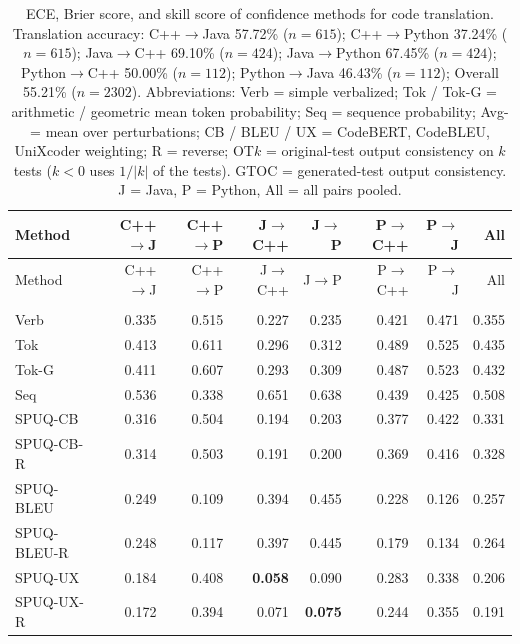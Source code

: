 {\scriptsize
\setlength{\tabcolsep}{2.5pt}
\renewcommand{\arraystretch}{0.95}
\begin{longtable}{@{}lrrrrrrr@{}}
\caption{ECE, Brier score, and skill score of confidence methods for code translation. Translation accuracy: C++$\rightarrow$Java 57.72\% ($n=615$); C++$\rightarrow$Python 37.24\% ($n=615$); Java$\rightarrow$C++ 69.10\% ($n=424$); Java$\rightarrow$Python 67.45\% ($n=424$); Python$\rightarrow$C++ 50.00\% ($n=112$); Python$\rightarrow$Java 46.43\% ($n=112$); Overall 55.21\% ($n=2302$). Abbreviations: Verb = simple verbalized; Tok / Tok-G = arithmetic / geometric mean token probability; Seq = sequence probability; Avg- = mean over perturbations; CB / BLEU / UX = CodeBERT, CodeBLEU, UniXcoder weighting; R = reverse; OT$k$ = original-test output consistency on $k$ tests ($k<0$ uses $1/|k|$ of the tests). GTOC = generated-test output consistency. J = Java, P = Python, All = all pairs pooled.\label{tab:translation-calibration}}\\
\toprule
Method & C++$\to$J & C++$\to$P & J$\to$C++ & J$\to$P & P$\to$C++ & P$\to$J & All \\
\midrule
\endfirsthead
\toprule
Method & C++$\to$J & C++$\to$P & J$\to$C++ & J$\to$P & P$\to$C++ & P$\to$J & All \\
\midrule
\endhead
\bottomrule
\endfoot
\multicolumn{8}{l}{\textit{ECE (10 bins, lower is better)}} \\
\midrule
Verb & 0.335 & 0.515 & 0.227 & 0.235 & 0.421 & 0.471 & 0.355 \\
\addlinespace
Tok & 0.413 & 0.611 & 0.296 & 0.312 & 0.489 & 0.525 & 0.435 \\
Tok-G & 0.411 & 0.607 & 0.293 & 0.309 & 0.487 & 0.523 & 0.432 \\
\addlinespace
Seq & 0.536 & 0.338 & 0.651 & 0.638 & 0.439 & 0.425 & 0.508 \\
\addlinespace
SPUQ-CB & 0.316 & 0.504 & 0.194 & 0.203 & 0.377 & 0.422 & 0.331 \\
SPUQ-CB-R & 0.314 & 0.503 & 0.191 & 0.200 & 0.369 & 0.416 & 0.328 \\
SPUQ-BLEU & 0.249 & 0.109 & 0.394 & 0.455 & 0.228 & 0.126 & 0.257 \\
SPUQ-BLEU-R & 0.248 & 0.117 & 0.397 & 0.445 & 0.179 & 0.134 & 0.264 \\
SPUQ-UX & 0.184 & 0.408 & \textbf{0.058} & 0.090 & 0.283 & 0.338 & 0.206 \\
SPUQ-UX-R & 0.172 & 0.394 & 0.071 & \textbf{0.075} & 0.244 & 0.355 & 0.191 \\

\end{longtable}}
